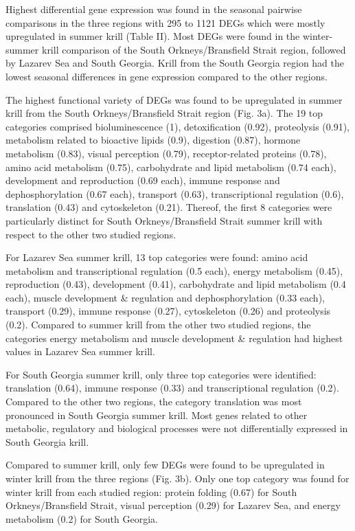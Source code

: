 Highest differential gene expression was found in the seasonal pairwise
comparisons in the three regions with 295 to 1121 DEGs which were mostly
upregulated in summer krill (Table II). Most DEGs were found in the
winter-summer krill comparison of the South Orkneys/Bransfield Strait region,
followed by Lazarev Sea and South Georgia. Krill from the South Georgia region
had the lowest seasonal differences in gene expression compared to the other
regions.

The highest functional variety of DEGs was found to be upregulated in summer
krill from the South Orkneys/Bransfield Strait region (Fig. 3a). The 19 top
categories comprised bioluminescence (1), detoxification (0.92), proteolysis
(0.91), metabolism related to bioactive lipids (0.9), digestion (0.87), hormone
metabolism (0.83), visual perception (0.79),  receptor-related proteins (0.78),
amino acid metabolism (0.75), carbohydrate and lipid metabolism (0.74 each),
development and reproduction (0.69 each), immune response and dephosphorylation
(0.67 each), transport (0.63), transcriptional regulation (0.6), translation
(0.43) and cytoskeleton (0.21). Thereof, the first 8 categories were
particularly distinct for South Orkneys/Bransfield Strait summer krill with
respect to the other two studied regions.

For Lazarev Sea summer krill, 13 top categories were found: amino acid
metabolism and transcriptional regulation (0.5 each), energy metabolism (0.45),
reproduction (0.43), development (0.41), carbohydrate and lipid metabolism (0.4
each), muscle development \& regulation and dephosphorylation (0.33 each),
transport (0.29), immune response (0.27), cytoskeleton (0.26) and proteolysis
(0.2). Compared to summer krill from the other two studied  regions, the
categories energy metabolism and muscle development \& regulation had highest
values in Lazarev Sea summer krill. 

For South Georgia summer krill, only three top categories were identified:
translation (0.64), immune response (0.33) and transcriptional regulation
(0.2). Compared to the other two regions, the category translation was most
pronounced in South Georgia summer krill. Most genes related to other
metabolic, regulatory and biological processes were not differentially
expressed in South Georgia krill.

Compared to summer krill, only few DEGs were found to be upregulated in winter
krill from the three regions (Fig. 3b).  Only one top category was found for
winter krill from each studied region: protein folding (0.67) for South
Orkneys/Bransfield Strait, visual perception (0.29) for Lazarev Sea, and energy
metabolism (0.2) for South Georgia. 

